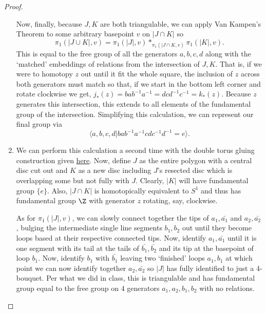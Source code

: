 \begin{proof}
\begin{enumerate}[label = (\alph*)]
\begin{center}
        \end{center}
    
        Now, finally, because $J, K$ are both triangulable, we can apply Van Kampen's Theorem to some arbitrary basepoint $v$ on $|J \cap K|$ so $$\pi_1(|J\cup K|,v) = \pi_1(|J|,v) *_{\pi_1(|J\cap K,v)}\pi_1(|K|,v).$$ This is equal to the free group of all the generators $a,b,c,d$ along with the `matched' embeddings of relations from the intersection of $J,K$. That is, if we were to homotopy $z$ out until it fit the whole square, the inclusion of $z$ across both generators must match so that, if we start in the bottom left corner and rotate clockwise we get, $j_*(z) = bab^{-1}a^{-1} = dcd^{-1}c^{-1} = k_*(z)$. Because $z$ generates this intersection, this extends to all elements of the fundamental group of the intersection. Simplifying this calculation, we can represent our final group via $$\langle a,b,c,d | bab^{-1}a^{-1}cdc^{-1}d^{-1}=e\rangle.$$

        \item We can perform this calculation a second time with the double torus gluing construction given \href{http://www.map.mpim-bonn.mpg.de/File:Polygon_construction.png}{here}. Now, define $J$ as the entire polygon with a central disc cut out and $K$ as a new disc including $J$'s resected disc which is overlapping some but not fully with $J$. Clearly, $|K|$ will have fundamental group $\{e\}$. Also, $|J\cap K|$ is homotopically equivalent to $S^1$ and thus has fundamental group $\Z$ with generator $z$ rotating, say, clockwise. 
        
        As for $\pi_1(|J|, v)$, we can slowly connect together the tips of $a_1, \bar{a_1}$ and $a_2, \bar{a_2}$, bulging the intermediate single line segments $b_1, b_2$ out until they become loops based at their respective connected tips. Now, identify $a_1, \bar{a_1}$ until it is one segment with its tail at the tails of $\bar{b_1}, \bar{b_2}$ and its tip at the basepoint of loop $b_1$. Now, identify $b_1$ with $\bar{b_1}$ leaving two `finished' loops $a_1, b_1$ at which point we can now identify together $a_2, \bar{a_2}$ so $|J|$ has fully identified to just a 4-bouquet. Per what we did in class, this is triangulable and has fundamental group equal to the free group on 4 generators $a_1,a_2,b_1,b_2$ with no relations.
        

\end{enumerate}
\end{proof}
